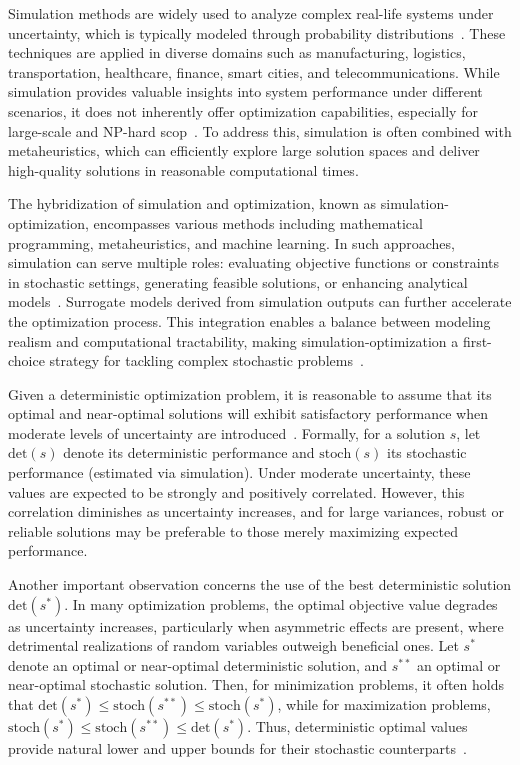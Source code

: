 Simulation methods are widely used to analyze complex real-life systems under
uncertainty, which is typically modeled through probability
distributions~\cite{lucas:2015}. These techniques are applied in diverse domains
such as manufacturing, logistics, transportation, healthcare, finance, smart
cities, and telecommunications. While simulation provides valuable insights into
system performance under different scenarios, it does not inherently offer
optimization capabilities, especially for large-scale and NP-hard
\gls{scop}~\cite{juan:2022}. To address this, simulation is often combined with
metaheuristics, which can efficiently explore large solution spaces and deliver
high-quality solutions in reasonable computational times.

The hybridization of simulation and optimization, known as
simulation-optimization, encompasses various methods including mathematical
programming, metaheuristics, and machine learning. In such approaches,
simulation can serve multiple roles: evaluating objective functions or
constraints in stochastic settings, generating feasible solutions, or enhancing
analytical models~\cite{juan:2015}. Surrogate models derived from simulation
outputs can further accelerate the optimization process. This integration
enables a balance between modeling realism and computational tractability,
making simulation-optimization a first-choice strategy for tackling complex
stochastic problems~\cite{juan:2022}.

Given a deterministic optimization problem, it is reasonable to assume that its
optimal and near-optimal solutions will exhibit satisfactory performance when
moderate levels of uncertainty are introduced~\cite{juan:2022}. Formally, for a
solution $s$, let $\text{det}(s)$ denote its deterministic performance and
$\text{stoch}(s)$ its stochastic performance (estimated via simulation). Under
moderate uncertainty, these values are expected to be strongly and positively
correlated. However, this correlation diminishes as uncertainty increases, and
for large variances, robust or reliable solutions may be preferable to those
merely maximizing expected performance.

Another important observation concerns the use of the best deterministic
solution $\text{det}(s^*)$. In many optimization problems, the optimal objective
value degrades as uncertainty increases, particularly when asymmetric effects
are present, where detrimental realizations of random variables outweigh
beneficial ones. Let $s^*$ denote an optimal or near-optimal deterministic
solution, and $s^{**}$ an optimal or near-optimal stochastic solution. Then, for
minimization problems, it often holds that $\text{det}(s^*) \leq
	\text{stoch}(s^{**}) \leq \text{stoch}(s^*)$, while for maximization problems,
$\text{stoch}(s^*) \leq \text{stoch}(s^{**}) \leq \text{det}(s^*)$. Thus,
deterministic optimal values provide natural lower and upper bounds for their
stochastic counterparts~\cite{juan:2022}.

